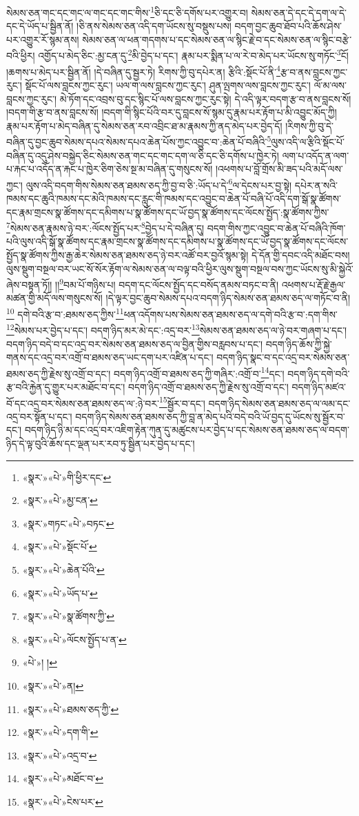 སེམས་ཅན་གང་དང་གང་ལ་གང་དང་གང་གིས་\footnote{«སྣར་»«པེ་»གི་ཕྱིར་དང་}ཅི་དང་ཅི་དགོས་པར་འགྱུར་བ། སེམས་ཅན་དེ་དང་དེ་དག་ལ་དེ་དང་དེ་ཡོད་པ་སྦྱིན་ནོ། །ཅི་ནས་སེམས་ཅན་འདི་དག་ཡོངས་སུ་བསྡུས་པས། བདག་བྱང་ཆུབ་ཐོབ་པའི་ཆོས་ཤེས་པར་འགྱུར་རོ་སྙམ་ནས། སེམས་ཅན་ལ་ཕན་གདགས་པ་དང་སེམས་ཅན་ལ་སྙིང་རྗེ་བ་དང་སེམས་ཅན་ལ་སྙིང་བརྩེ་བའི་ཕྱིར། འགྱོད་པ་མེད་ཅིང་:མྱ་ངན་དུ་\footnote{«སྣར་»«པེ་»མྱ་ངན་}མི་བྱེད་པ་དང་། རྣམ་པར་སྨིན་པ་ལ་རེ་བ་མེད་པར་ཡོངས་སུ་གཏོང་\footnote{«སྣར་»གཏང་«པེ་»བཏང་}ངོ། །ཆགས་པ་མེད་པར་སྦྱིན་ནོ། །དེ་བཞིན་དུ་སྦྱར་ཏེ། རིགས་ཀྱི་བུ་དཔེར་ན། རྩིའི་:སྡོང་པོ་ནི་\footnote{«སྣར་»«པེ་»སྡོང་པོ་}རྩ་བ་ནས་བླངས་ཀྱང་རུང་། སྡོང་པོ་ལས་བླངས་ཀྱང་རུང་། ཡལ་ག་ལས་བླངས་ཀྱང་རུང་། ཤུན་ལྤགས་ལས་བླངས་ཀྱང་རུང་། ལོ་མ་ལས་བླངས་ཀྱང་རུང་། མེ་ཏོག་དང་འབྲས་བུ་དང་སྙིང་པོ་ལས་བླངས་ཀྱང་རུང་སྟེ། དེ་འདི་ལྟར་བདག་རྩ་བ་ནས་བླངས་སོ། །བདག་གི་རྩ་བ་ནས་བླངས་སོ། །བདག་གི་སྙིང་པོའི་བར་དུ་བླངས་སོ་སྙམ་དུ་རྣམ་པར་རྟོག་པ་མི་འབྱུང་མོད་ཀྱི། རྣམ་པར་རྟོག་པ་མེད་བཞིན་དུ་སེམས་ཅན་རབ་འབྲིང་ཐ་མ་རྣམས་ཀྱི་ནད་མེད་པར་བྱེད་དོ། །རིགས་ཀྱི་བུ་དེ་བཞིན་དུ་བྱང་ཆུབ་སེམས་དཔའ་སེམས་དཔའ་ཆེན་པོས་ཀྱང་འབྱུང་བ་:ཆེན་པོ་བཞིའི་\footnote{«སྣར་»«པེ་»ཆེན་པོའི་}ལུས་འདི་ལ་རྩིའི་སྡོང་པོ་བཞིན་དུ་འདུ་ཤེས་བསྐྱེད་ཅིང་སེམས་ཅན་གང་དང་གང་དག་ལ་ཅི་དང་ཅི་དགོས་པ་ཁྱེར་ཏེ། ལག་པ་འདོད་ན་ལག་པ་རྐང་པ་འདོད་ན་རྐང་པ་ཁྱེར་ཅིག་ཅེས་སྔ་མ་བཞིན་དུ་གསུངས་སོ། །འཕགས་པ་བློ་གྲོས་མི་ཟད་པའི་མདོ་ལས་ཀྱང་། ལུས་འདི་བདག་གིས་སེམས་ཅན་ཐམས་ཅད་ཀྱི་བྱ་བ་ཅི་:ཡོད་པ་དེ་\footnote{«སྣར་»«པེ་»ཡོད་པ་}ལ་དེངས་པར་བྱ་སྟེ། དཔེར་ན་སའི་ཁམས་དང་ཆུའི་ཁམས་དང་མེའི་ཁམས་དང་རླུང་གི་ཁམས་དང་འབྱུང་བ་ཆེན་པོ་བཞི་པོ་འདི་དག་སྒོ་སྣ་ཚོགས་དང་རྣམ་གྲངས་སྣ་ཚོགས་དང་དམིགས་པ་སྣ་ཚོགས་དང་ཡོ་བྱད་སྣ་ཚོགས་དང་ལོངས་སྤྱོད་:སྣ་ཚོགས་ཀྱིས་\footnote{«སྣར་»«པེ་»སྣ་ཚོགས་ཀྱི་}སེམས་ཅན་རྣམས་ཉེ་བར་:ལོངས་སྤྱོད་པར་\footnote{«སྣར་»«པེ་»ལོངས་སྤྱོད་པ་ན་}བྱེད་པ་དེ་བཞིན་དུ། བདག་གིས་ཀྱང་འབྱུང་བ་ཆེན་པོ་བཞིའི་ཁོག་པའི་ལུས་འདི་སྒོ་སྣ་ཚོགས་དང་རྣམ་གྲངས་སྣ་ཚོགས་དང་དམིགས་པ་སྣ་ཚོགས་དང་ཡོ་བྱད་སྣ་ཚོགས་དང་ལོངས་སྤྱོད་སྣ་ཚོགས་ཀྱིས་རྒྱ་ཆེར་སེམས་ཅན་ཐམས་ཅད་ཉེ་བར་འཚོ་བར་བྱའོ་སྙམ་སྟེ། དེ་དོན་གྱི་དབང་འདི་མཐོང་བས། ལུས་སྡུག་བསྔལ་བར་ཡང་སོ་སོར་རྟོག་ལ་སེམས་ཅན་ལ་བལྟ་བའི་ཕྱིར་ལུས་སྡུག་བསྔལ་བས་ཀྱང་ཡོངས་སུ་མི་སྐྱེའོ་ཞེས་བསྟན་ཏོ།། །།\footnote{«པེ་»། །}བམ་པོ་གཉིས་པ། བདག་དང་ལོངས་སྤྱོད་དང་བསོད་ནམས་བཏང་བ་ནི། འཕགས་པ་རྡོ་རྗེ་རྒྱལ་མཚན་གྱི་མདོ་ལས་གསུངས་སོ། །དེ་ལྟར་བྱང་ཆུབ་སེམས་དཔའ་བདག་ཉིད་སེམས་ཅན་ཐམས་ཅད་ལ་གཏོང་བ་ནི།\footnote{«སྣར་»«པེ་»ན།} དགེ་བའི་རྩ་བ་:ཐམས་ཅད་ཀྱིས་\footnote{«སྣར་»«པེ་»ཐམས་ཅད་ཀྱི་}ཕན་འདོགས་པས་སེམས་ཅན་ཐམས་ཅད་ལ་དགེ་བའི་རྩ་བ་:དག་གིས་\footnote{«སྣར་»«པེ་»དག་གི་}སེམས་པར་བྱེད་པ་དང་། བདག་ཉིད་མར་མེ་དང་:འདྲ་བར་\footnote{«སྣར་»«པེ་»འདྲ་བ་}སེམས་ཅན་ཐམས་ཅད་ལ་ཉེ་བར་གཞག་པ་དང་། བདག་ཉིད་བདེ་བ་དང་འདྲ་བར་སེམས་ཅན་ཐམས་ཅད་ལ་བྱིན་གྱིས་བརླབས་པ་དང་། བདག་ཉིད་ཆོས་ཀྱི་སྐྱེ་གནས་དང་འདྲ་བར་འགྲོ་བ་ཐམས་ཅད་ཡང་དག་པར་འཛིན་པ་དང་། བདག་ཉིད་སྣང་བ་དང་འདྲ་བར་སེམས་ཅན་ཐམས་ཅད་ཀྱི་རྗེས་སུ་འགྲོ་བ་དང་། བདག་ཉིད་འགྲོ་བ་ཐམས་ཅད་ཀྱི་གཞིར་:འགྲོ་བ་\footnote{«སྣར་»«པེ་»མཐོང་བ་}དང་། བདག་ཉིད་དགེ་བའི་རྩ་བའི་རྐྱེན་དུ་གྱུར་པར་མཐོང་བ་དང་། བདག་ཉིད་འགྲོ་བ་ཐམས་ཅད་ཀྱི་རྗེས་སུ་འགྲོ་བ་དང་། བདག་ཉིད་མཛའ་བོ་དང་འདྲ་བར་སེམས་ཅན་ཐམས་ཅད་ལ་:ཉེ་བར་\footnote{«སྣར་»«པེ་»ངེས་པར་}སྦྱོར་བ་དང་། བདག་ཉིད་སེམས་ཅན་ཐམས་ཅད་ལ་ལམ་དང་འདྲ་བར་སྟོན་པ་དང་། བདག་ཉིད་སེམས་ཅན་ཐམས་ཅད་ཀྱི་བླ་ན་མེད་པའི་བདེ་བའི་ཡོ་བྱད་དུ་ཡོངས་སུ་སྦྱོར་བ་དང་། བདག་ཉིད་ཉི་མ་དང་འདྲ་བར་འཇིག་རྟེན་ཀུན་དུ་མཚུངས་པར་བྱེད་པ་དང་སེམས་ཅན་ཐམས་ཅད་ལ་བདག་ཉིད་དེ་ལྟ་བུའི་ཆོས་དང་ལྡན་པར་རབ་ཏུ་སྦྱིན་པར་བྱེད་པ་དང་། 